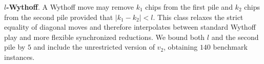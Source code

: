 \documentclass[review]{elsarticle}
\newcommand{\set}[1]{\{ #1 \}}
\newcommand{\tuple}[1]{\langle {#1} \rangle}
\newcommand{\true}{\top}
\newcommand{\statevar}{\mathcal{X}}
\newcommand{\act}{\mathcal{A}}
\newcommand{\constraint}{\mathcal{C}}
\newcommand{\estate}{\mathcal{E}}
\newcommand{\pre}{\mathtt{pre}}
\newcommand{\eff}{\mathtt{eff}}
\begin{document}
\textbf{$l$-Wythoff}. A Wythoff move may remove $k_1$ chips from the first pile and $k_2$ chips from the second pile provided that $|k_1-k_2|<l$.
This class relaxes the strict equality of diagonal moves and therefore interpolates between standard Wythoff play and more flexible synchronized reductions.
We bound both $l$ and the second pile by $5$ and include the unrestricted version of $v_2$, obtaining $140$ benchmark instances.
\end{document}
